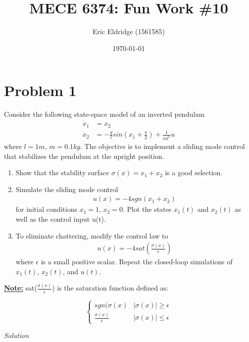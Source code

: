 \documentclass{article}
\title{MECE 6374: Fun Work \#10}
\date{\today}
\author{Eric Eldridge (1561585)}
\begin{document}
  \maketitle

  \section{Problem 1}

  Consider the following state-space model of an inverted pendulum 
  \begin{align*}
    \dot{x}_1 &= x_2 \\
    \dot{x}_2 &= -\frac{g}{l}sin(x_1 + \frac{\pi}{2}) + \frac{1}{ml^2}u
  \end{align*}
  where $l = 1 m$, $m = 0.1 kg$. The objective is to implement a sliding mode
  control that stabilizes the pendulum at the upright position. 
  \begin{enumerate}[label=(\roman*)]
    \item Show that the stability surface $\sigma (x) = x_1 + x_2$ is a good selection.
    \item Simulate the sliding mode control
      \begin{align*}
        u(x) = -4sgn(x_1 + x_2)
      \end{align*}
    for initial conditions $x_1=1$, $x_2=0$. Plot the states $x_1(t)$ and $x_2(t)$
    as well as the control input u(t).
    \item To eliminate chattering, modify the control law to
      \begin{align*}
        u(x) = -4sat(\frac{\sigma (x)}{\epsilon})
      \end{align*}
    where $\epsilon$ is a small positive scalar. Repeat the closed-loop
    simulations of $x_1(t)$, $x_2(t)$, and $u(t)$.
  \end{enumerate}

  \textbf{\underline{Note:}} sat($\frac{\sigma (x)}{\epsilon}$) is the
  saturation function defined as:

  \[
    \begin{cases} 
      sgn(\sigma (x) & |\sigma (x)| \geq \epsilon \\
      \frac{\sigma (x)}{\epsilon} & |\sigma (x)| \leq \epsilon
    \end{cases}
  \]

  \newpage

  \textit{Solution} \newline \newline
\end{document}
